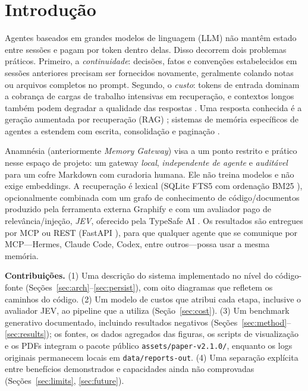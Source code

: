 \documentclass[conference,onecolumn,11pt]{IEEEtran}
\newcommand{\anam}{Anam\-n\'esia}
\begin{document}
\section{Introdução}
Agentes baseados em grandes modelos de linguagem (LLM) não mantêm estado entre sessões e pagam por token dentro delas. Disso decorrem dois problemas práticos. Primeiro, a \emph{continuidade}: decisões, fatos e convenções estabelecidos em sessões anteriores precisam ser fornecidos novamente, geralmente colando notas ou arquivos completos no prompt. Segundo, o \emph{custo}: tokens de entrada dominam a cobrança de cargas de trabalho intensivas em recuperação, e contextos longos também podem degradar a qualidade das respostas \cite{liu2024lostmiddle}. Uma resposta conhecida é a geração aumentada por recuperação (RAG) \cite{lewis2020rag,gao2023ragsurvey}; sistemas de memória específicos de agentes a estendem com escrita, consolidação e paginação \cite{packer2023memgpt,park2023generative,zhong2024memorybank,chhikara2025mem0}.

\anam{} (anteriormente \emph{Memory Gateway}) visa a um ponto restrito e prático nesse espaço de projeto: um gateway \emph{local}, \emph{independente de agente} e \emph{auditável} para um cofre Markdown com curadoria humana. Ele não treina modelos e não exige embeddings. A recuperação é lexical (SQLite FTS5 com ordenação BM25 \cite{sqlitefts5,robertson2009bm25}), opcionalmente combinada com um grafo de conhecimento de código/documentos produzido pela ferramenta externa Graphify \cite{graphify} e com um avaliador pago de relevância/injeção, \emph{JEV}, oferecido pela TypeSafe AI \cite{typesafedocs}. Os resultados são entregues por MCP \cite{mcpspec} ou REST (FastAPI \cite{fastapi}), para que qualquer agente que se comunique por MCP---Hermes, Claude Code, Codex, entre outros---possa usar a mesma memória.

\textbf{Contribuições.} (1) Uma descrição do sistema implementado no nível do código-fonte (Seções~\ref{sec:arch}--\ref{sec:persist}), com oito diagramas que refletem os caminhos do código. (2) Um modelo de custos que atribui cada etapa, inclusive o avaliador JEV, ao pipeline que a utiliza (Seção~\ref{sec:cost}). (3) Um benchmark generativo documentado, incluindo resultados negativos (Seções~\ref{sec:method}--\ref{sec:results}); os fontes, os dados agregados das figuras, os scripts de visualização e os PDFs integram o pacote público \texttt{assets/paper-v2.1.0/}, enquanto os logs originais permanecem locais em \texttt{data/reports-out}. (4) Uma separação explícita entre benefícios demonstrados e capacidades ainda não comprovadas (Seções~\ref{sec:limits}, \ref{sec:future}).
\end{document}
